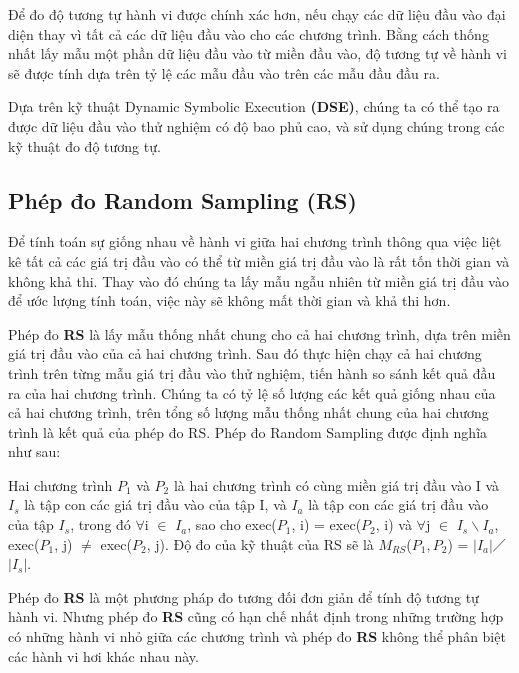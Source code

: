 Để đo độ tương tự hành vi được chính xác hơn, nếu chạy các dữ liệu đầu vào đại diện thay vì tất cả các dữ liệu đầu vào cho các chương trình. Bằng cách thống nhất lấy mẫu một phần dữ liệu đầu vào từ miền đầu vào, độ tương tự về hành vi sẽ được tính dựa trên tỷ lệ các mẫu đầu vào trên các mẫu đầu đầu ra.

Dựa trên kỹ thuật Dynamic Symbolic Execution \textbf{(DSE)}, chúng ta có thể tạo ra được dữ liệu đầu vào thử nghiệm có độ bao phủ cao, và sử dụng chúng trong các kỹ thuật đo độ tương tự.

\subsection{Phép đo Random Sampling (RS)}
Để tính toán sự giống nhau về hành vi giữa hai chương trình thông qua việc liệt kê tất cả các giá trị đầu vào có thể từ miền giá trị đầu vào là rất tốn thời gian và không khả thi. Thay vào đó chúng ta lấy mẫu ngẫu nhiên từ miền giá trị đầu vào để ước lượng tính toán, việc này sẽ không mất thời gian và khả thi hơn.

Phép đo \textbf{RS} là lấy mẫu thống nhất chung cho cả hai chương trình, dựa trên miền giá trị đầu vào của cả hai chương trình. Sau đó thực hiện chạy cả hai chương trình trên từng mẫu giá trị đầu vào thử nghiệm, tiến hành so sánh kết quả đầu ra của hai chương trình. Chúng ta có tỷ lệ số lượng các kết quả giống nhau của cả hai chương trình, trên tổng số lượng mẫu thống nhất chung của hai chương trình là kết quả của phép đo RS. Phép đo Random Sampling được định nghĩa như sau:
 
\begin{definition}
  Hai chương trình $P_{1}$ và $P_{2}$ là hai chương trình có cùng miền
  giá trị đầu vào I và $I_{s}$ là tập con các giá trị đầu vào của tập
  I, và $I_{a}$ là tập con các giá trị đầu vào của tập $I_{s}$, trong
  đó $\forall$i $\in$ $I_{a}$, sao cho exec($P_{1}$, i) =
  exec($P_{2}$, i) và $\forall$j $\in$ $I_{s} \backslash I_{a}$,
  exec($P_{1}$, j) $\neq$ exec($P_{2}$, j). Độ đo của kỹ thuật của RS
  sẽ là $M_{RS}$($P_{1},P_{2}$) =
  $\left|I_{a}\right|$$\diagup$$\left|I_{s}\right|$.
\end{definition}

Phép đo \textbf{RS} là một phương pháp đo tương đối đơn giản để tính độ tương tự hành vi. Nhưng phép đo \textbf{RS} cũng có hạn chế nhất định trong những trường hợp có những hành vi nhỏ giữa các chương trình và phép đo \textbf{RS } không thể phân biệt các hành vi hơi khác nhau này.

